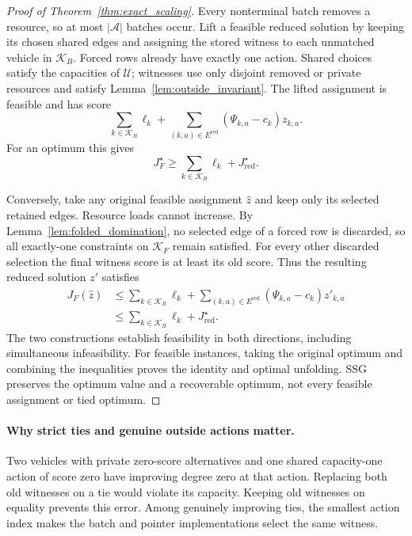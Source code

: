 \begin{proof}[Proof of Theorem~\ref{thm:exact_scaling}]
Every nonterminal batch removes a resource, so at most $|\mathcal A|$
batches occur. Lift a feasible reduced solution by keeping its chosen
shared edges and assigning the stored witness to each unmatched
vehicle in $\mathcal K_B$. Forced rows already have exactly one
action. Shared choices satisfy the capacities of $\mathcal U$;
witnesses use only disjoint removed or private resources and satisfy
Lemma~\ref{lem:outside_invariant}. The lifted assignment is feasible
and has score
\begin{equation}
\sum_{k\in\mathcal K_B}\ell_k+
\sum_{(k,a)\in E^{\mathrm{red}}}(\Psi_{k,a}-c_k)z_{k,a}.
\label{eq:unfolded_score_identity}
\end{equation}
For an optimum this gives
\begin{equation}
J_F^\star\ge\sum_{k\in\mathcal K_B}\ell_k+J_{\mathrm{red}}^\star.
\label{eq:scaling_lower_direction}
\end{equation}

Conversely, take any original feasible assignment $\widehat z$ and keep only its
selected retained edges. Resource loads cannot increase. By
Lemma~\ref{lem:folded_domination}, no selected edge of a forced row
is discarded, so all exactly-one constraints on $\mathcal K_F$
remain satisfied. For every other discarded selection the final
witness score is at least its old score. Thus the resulting reduced
solution $z'$ satisfies
\begin{equation}
\begin{split}
J_F(\widehat z)&\le\sum_{k\in\mathcal K_B}\ell_k+
\sum_{(k,a)\in E^{\mathrm{red}}}(\Psi_{k,a}-c_k)z'_{k,a}\\
&\le\sum_{k\in\mathcal K_B}\ell_k+J_{\mathrm{red}}^\star.
\end{split}
\label{eq:scaling_upper_direction}
\end{equation}
The two constructions establish feasibility in both directions,
including simultaneous infeasibility. For feasible instances, taking
the original optimum and combining the inequalities proves the
identity and optimal unfolding. SSG preserves the optimum value and
a recoverable optimum, not every feasible assignment or tied optimum.
\end{proof}

\paragraph{Why strict ties and genuine outside actions matter.}
Two vehicles with private zero-score alternatives and one shared
capacity-one action of score zero have improving degree zero at that
action. Replacing both old witnesses on a tie would violate its
capacity. Keeping old witnesses on equality prevents this error.
Among genuinely improving ties, the smallest action index makes the
batch and pointer implementations select the same witness.

